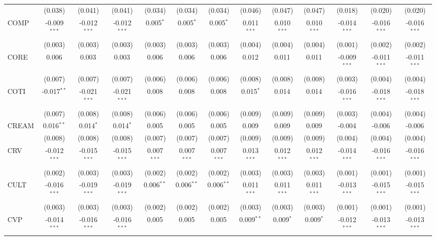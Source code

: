 \begin{table}[!htbp]
\begin{tabular}{@{\extracolsep{5pt}}lcccccccccccc}
  & (0.038) & (0.041) & (0.041) & (0.034) & (0.034) & (0.034) & (0.046) & (0.047) & (0.047) & (0.018) & (0.020) & (0.020) \\
 COMP & -0.009$^{***}$ & -0.012$^{***}$ & -0.012$^{***}$ & 0.005$^{*}$ & 0.005$^{*}$ & 0.005$^{*}$ & 0.011$^{***}$ & 0.010$^{***}$ & 0.010$^{***}$ & -0.014$^{***}$ & -0.016$^{***}$ & -0.016$^{***}$ \\
  & (0.003) & (0.003) & (0.003) & (0.003) & (0.003) & (0.003) & (0.004) & (0.004) & (0.004) & (0.001) & (0.002) & (0.002) \\
 CORE & 0.006$^{}$ & 0.003$^{}$ & 0.003$^{}$ & 0.006$^{}$ & 0.006$^{}$ & 0.006$^{}$ & 0.012$^{}$ & 0.011$^{}$ & 0.011$^{}$ & -0.009$^{***}$ & -0.011$^{***}$ & -0.011$^{***}$ \\
  & (0.007) & (0.007) & (0.007) & (0.006) & (0.006) & (0.006) & (0.008) & (0.008) & (0.008) & (0.003) & (0.004) & (0.004) \\
 COTI & -0.017$^{**}$ & -0.021$^{***}$ & -0.021$^{***}$ & 0.008$^{}$ & 0.008$^{}$ & 0.008$^{}$ & 0.015$^{*}$ & 0.014$^{}$ & 0.014$^{}$ & -0.016$^{***}$ & -0.018$^{***}$ & -0.018$^{***}$ \\
  & (0.007) & (0.008) & (0.008) & (0.006) & (0.006) & (0.006) & (0.009) & (0.009) & (0.009) & (0.003) & (0.004) & (0.004) \\
 CREAM & 0.016$^{**}$ & 0.014$^{*}$ & 0.014$^{*}$ & 0.005$^{}$ & 0.005$^{}$ & 0.005$^{}$ & 0.009$^{}$ & 0.009$^{}$ & 0.009$^{}$ & -0.004$^{}$ & -0.006$^{}$ & -0.006$^{}$ \\
  & (0.008) & (0.008) & (0.008) & (0.007) & (0.007) & (0.007) & (0.009) & (0.009) & (0.009) & (0.004) & (0.004) & (0.004) \\
 CRV & -0.012$^{***}$ & -0.015$^{***}$ & -0.015$^{***}$ & 0.007$^{***}$ & 0.007$^{***}$ & 0.007$^{***}$ & 0.013$^{***}$ & 0.012$^{***}$ & 0.012$^{***}$ & -0.014$^{***}$ & -0.016$^{***}$ & -0.016$^{***}$ \\
  & (0.002) & (0.003) & (0.003) & (0.002) & (0.002) & (0.002) & (0.003) & (0.003) & (0.003) & (0.001) & (0.001) & (0.001) \\
 CULT & -0.016$^{***}$ & -0.019$^{***}$ & -0.019$^{***}$ & 0.006$^{**}$ & 0.006$^{**}$ & 0.006$^{**}$ & 0.011$^{***}$ & 0.011$^{***}$ & 0.011$^{***}$ & -0.013$^{***}$ & -0.015$^{***}$ & -0.015$^{***}$ \\
  & (0.003) & (0.003) & (0.003) & (0.002) & (0.002) & (0.002) & (0.003) & (0.003) & (0.003) & (0.001) & (0.001) & (0.001) \\
 CVP & -0.014$^{***}$ & -0.016$^{***}$ & -0.016$^{***}$ & 0.005$^{}$ & 0.005$^{}$ & 0.005$^{}$ & 0.009$^{**}$ & 0.009$^{*}$ & 0.009$^{*}$ & -0.012$^{***}$ & -0.013$^{***}$ & -0.013$^{***}$ \\

\end{tabular}
\end{table}
